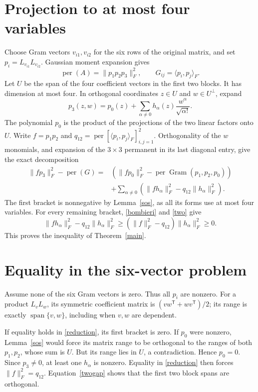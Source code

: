 \documentclass[11pt]{article}
\newcommand{\per}{\operatorname{per}}
\begin{document}
\section{Projection to at most four variables}
Choose Gram vectors $v_{i1},v_{i2}$ for the six rows of the original matrix,
and set $p_i=L_{v_{i1}}L_{v_{i2}}$. Gaussian moment expansion gives
\[
 \per(A)=\|p_1p_2p_3\|_F^2,\qquad G_{ij}=\langle p_i,p_j\rangle_F.
\]
Let $U$ be the span of the four coefficient vectors in the first two blocks.
It has dimension at most four. In orthogonal coordinates $z\in U$ and
$w\in U^\perp$, expand
\[
 p_3(z,w)=p_0(z)+\sum_{\alpha\ne0}h_\alpha(z)\frac{w^\alpha}{\sqrt{\alpha!}}.
\]
The polynomial $p_0$ is the product of the projections of the two linear
factors onto $U$. Write $f=p_1p_2$ and
$q_{12}=\per[\langle p_i,p_j\rangle_F]_{i,j=1}^2$.
Orthogonality of the $w$ monomials, and expansion of the $3\times3$
permanent in its last diagonal entry, give the exact decomposition
\begin{align}\label{reduction}
\|fp_3\|_F^2-\per(G)
={}&\left(\|fp_0\|_F^2-
       \per\operatorname{Gram}(p_1,p_2,p_0)\right)\nonumber\\
 &+\sum_{\alpha\ne0}
    \left(\|fh_\alpha\|_F^2-q_{12}\|h_\alpha\|_F^2\right).
\end{align}
The first bracket is nonnegative by Lemma~\ref{sos}, as all its forms use
at most four variables. For every remaining bracket, \eqref{bombieri}
and \eqref{two} give
\[
 \|fh_\alpha\|_F^2-q_{12}\|h_\alpha\|_F^2
 \geq (\|f\|_F^2-q_{12})\|h_\alpha\|_F^2\geq0.
\]
This proves the inequality of Theorem~\ref{main}.

\section{Equality in the six-vector problem}
Assume none of the six Gram vectors is zero. Thus all $p_i$ are nonzero.
For a product $L_vL_w$, its symmetric coefficient matrix is
$(vw^{\mathsf T}+wv^{\mathsf T})/2$; its range is exactly
$\operatorname{span}\{v,w\}$, including when $v,w$ are dependent.

If equality holds in \eqref{reduction}, its first bracket is zero.
If $p_0$ were nonzero, Lemma~\ref{sos} would force its matrix range to be
orthogonal to the ranges of both $p_1,p_2$, whose sum is $U$. But its range
lies in $U$, a contradiction. Hence $p_0=0$. Since $p_3\ne0$, at least one
$h_\alpha$ is nonzero. Equality in \eqref{reduction} then forces
$\|f\|_F^2=q_{12}$. Equation~\eqref{twogap} shows that the first two block
spans are orthogonal.
\end{document}
